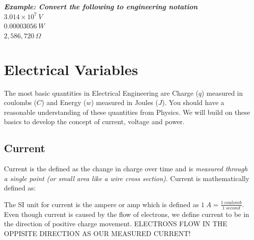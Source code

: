 \documentclass{handout}
\begin{document}
\em {\large{\textbf{Example: Convert the following to engineering notation}}} \em
\vspace{10pt}
\\
\vspace{10pt}
$3.014 \times 10^7 \ V$ \\
\vspace{10pt}
$0.00003056\ W$ \\
\vspace{10pt}
$2,586,720\ \Omega$

\begin{center}
\end{center}

\section{Electrical Variables}
The most basic quantities in Electrical Engineering are Charge ($q$) measured in coulombs ($C$) and Energy ($w$) measured in Joules ($J$).  You should have a reasonable understanding of these quantities from Physics.  We will build on these basics to develop the concept of current, voltage and power.

\subsection{Current}
Current is the defined as the change in charge over time and is {\em measured through a single point (or small area like a wire cross section)}. Current is mathematically defined as:


The SI unit for current is the ampere or amp which is defined as $1\ A = \frac{1\ coulomb}{1\ second}$. Even though current is caused by the flow of electrons, we define current to be in the direction of positive charge movement.  ELECTRONS FLOW IN THE OPPISITE DIRECTION AS OUR MEASURED CURRENT!
\end{document}
